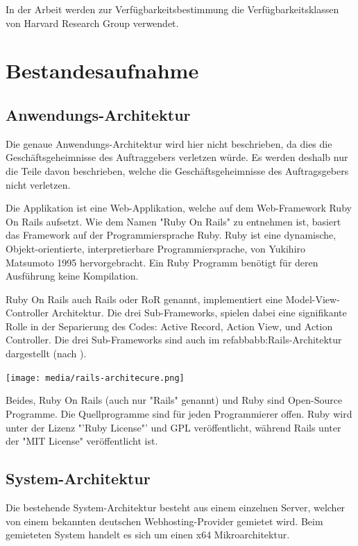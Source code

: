 In der Arbeit werden zur Verfügbarkeitsbestimmung die Verfügbarkeitsklassen von Harvard Research Group verwendet.


\section{Bestandesaufnahme}
\subsection{Anwendungs-Architektur}
Die genaue Anwendungs-Architektur wird hier nicht beschrieben, da dies die Geschäftsgeheimnisse des Auftraggebers verletzen würde. Es werden deshalb nur die Teile davon beschrieben, welche die Geschäftsgeheimnisse des Auftragsgebers nicht verletzen.

Die Applikation ist eine Web-Applikation, welche auf dem Web-Framework Ruby On Rails aufsetzt.
Wie dem Namen "Ruby On Rails" zu entnehmen ist, basiert das Framework auf der Programmiersprache Ruby. Ruby ist eine dynamische, Objekt-orientierte, interpretierbare Programmiersprache, von Yukihiro Matsumoto 1995 hervorgebracht. Ein Ruby Programm benötigt für deren Ausführung keine Kompilation.

Ruby On Rails auch Rails oder RoR genannt, implementiert eine Model-View-Controller Architektur. Die drei Sub-Frameworks, spielen dabei eine signifikante Rolle in der Separierung des Codes: Active Record, Action View, und Action Controller. Die drei Sub-Frameworks sind auch im refabb{abb:Rails-Architektur} dargestellt (nach \cite{Bachle2007}).

\begin{center}
\texttt{[image: media/rails-architecure.png]}
\end{center}

Beides, Ruby On Rails (auch nur "Rails" genannt) und Ruby sind Open-Source Programme. Die Quellprogramme sind für jeden Programmierer offen. Ruby wird unter der Lizenz "'Ruby License"' und GPL veröffentlicht, während Rails unter der "MIT License" veröffentlicht ist.

\subsection{System-Architektur}\label{System-Architektur}
Die bestehende System-Architektur besteht aus einem einzelnen Server, welcher von einem bekannten deutschen Webhosting-Provider gemietet wird. Beim gemieteten System handelt es sich um einen x64 Mikroarchitektur.

